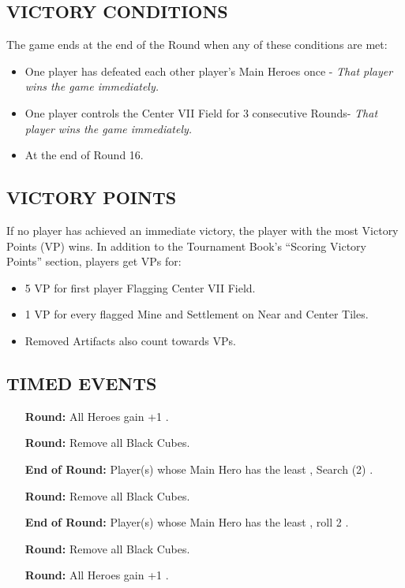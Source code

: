 \begin{multicols*}{2}
\subsection*{\MakeUppercase{Victory Conditions}}
The game ends at the end of the Round when any of these conditions are met:

\begin{itemize}
  \item One player has defeated each other player's Main Heroes once - \textit{That player wins the game immediately.}
  \item One player controls the Center VII Field for 3 consecutive Rounds- \textit{That player wins the game immediately.}
  \item At the end of Round 16.
\end{itemize}

\subsection*{\MakeUppercase{Victory Points}}
If no player has achieved an immediate victory, the player with the most Victory Points (VP) wins.
In addition to the Tournament Book's ``Scoring Victory Points'' section, players get VPs for:

\begin{itemize}
  \item 5 VP for first player Flagging Center VII Field.
  \item 1 VP for every flagged Mine and Settlement on Near and Center Tiles.
  \item Removed Artifacts also count towards VPs.
\end{itemize}

\subsection*{\MakeUppercase{Timed Events}}

\begin{itemize}
  \item[\textbf{\nth{1}}] \textbf{Round:} All Heroes gain +1 .
  \item[\textbf{\nth{4}}] \textbf{Round:} Remove all Black Cubes.
  \item[\textbf{End}] \textbf{of  Round:} Player(s) whose Main Hero has the least , Search (2) .
  \item[\textbf{\nth{9}}] \textbf{Round:} Remove all Black Cubes.
  \item[\textbf{End}] \textbf{of  Round:} Player(s) whose Main Hero has the least , roll 2 .
  \item[\textbf{\nth{12}}] \textbf{Round:} Remove all Black Cubes.
  \item[\textbf{\nth{13}}] \textbf{Round:} All Heroes gain +1 .
\end{itemize}

\end{multicols*}

